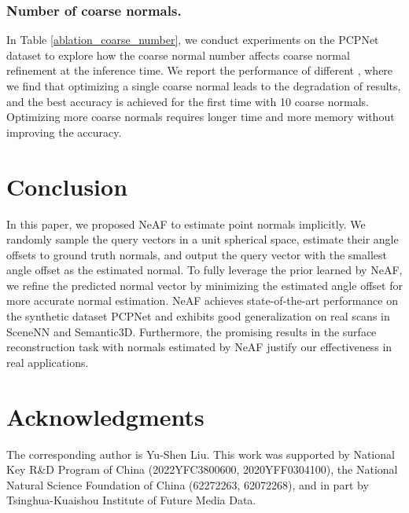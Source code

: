 \documentclass[letterpaper]{article} \usepackage{aaai23}  \usepackage{times}  \usepackage{helvet}  \usepackage{courier}  \usepackage[hyphens]{url}  \usepackage{graphicx} \urlstyle{rm} \def\UrlFont{\rm}  \usepackage{natbib}  \usepackage{caption} \frenchspacing  \setlength{\pdfpagewidth}{8.5in} \setlength{\pdfpageheight}{11in} \usepackage{algorithm}
\begin{document}
\subsubsection{Number of coarse normals.}
In Table \ref{ablation_coarse_number}, we conduct experiments on the PCPNet dataset to explore how the coarse normal number  affects coarse normal refinement at the inference time. We report the performance of different , where we find that optimizing a single coarse normal leads to the degradation of results, and the best accuracy is achieved for the first time with 10 coarse normals. Optimizing more coarse normals requires longer time and more memory without improving the accuracy.


\section{Conclusion}
In this paper, we proposed NeAF to estimate point normals implicitly. We randomly sample the query vectors in a unit spherical space, estimate their angle offsets to ground truth normals, and output the query vector with the smallest angle offset as the estimated normal. To fully leverage the prior learned by NeAF, we refine the predicted normal vector by minimizing the estimated angle offset for more accurate normal estimation. NeAF achieves state-of-the-art performance on the synthetic dataset PCPNet and exhibits good generalization on real scans in SceneNN and Semantic3D. Furthermore, the promising results in the surface reconstruction task with normals estimated by NeAF justify our effectiveness in real applications.

\section{Acknowledgments}
The corresponding author is Yu-Shen Liu. This work was supported by National Key R\&D Program of China (2022YFC3800600, 2020YFF0304100), the National Natural Science Foundation of China (62272263, 62072268), and in part by Tsinghua-Kuaishou Institute of Future Media Data.


\end{document}
